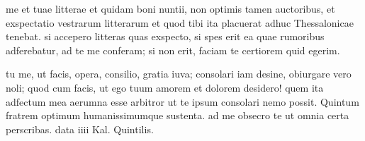 


 me et tuae litterae et quidam boni nuntii, non optimis tamen auctoribus, et exspectatio vestrarum litterarum et quod tibi ita placuerat adhuc Thessalonicae tenebat. si accepero litteras quas exspecto, si spes erit ea quae rumoribus adferebatur, ad te me conferam; si non erit, faciam te certiorem quid egerim.

 tu me, ut facis, opera, consilio, gratia iuva; consolari iam desine, obiurgare vero noli; quod cum facis, ut ego tuum amorem et dolorem desidero! quem ita adfectum mea aerumna esse arbitror ut te ipsum consolari nemo possit. Quintum fratrem optimum humanissimumque sustenta. ad me obsecro te ut omnia certa perscribas. data iiii Kal. Quintilis.
